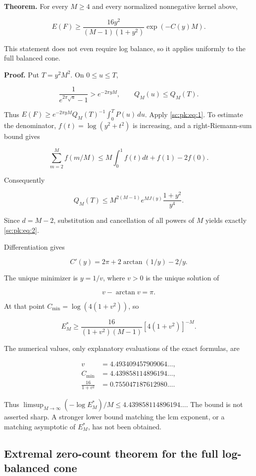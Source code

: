 \documentclass[11pt,a4paper]{article}
\theoremstyle{definition}
\theoremstyle{remark}
\theoremstyle{plain}
\numberwithin{equation}{section}
\begin{document}
\textbf{Theorem.} For every $M\ge4$ and every normalized nonnegative kernel
above,

\[
E(F)\ge
\frac{16y^2}{(M-1)(1+y^2)}\exp(-C(y)M).
\tag{PK.2}\label{sc:pk:eq:2}
\]

This statement does not even require log balance, so it applies
uniformly to the full balanced cone.

\textbf{Proof.} Put $T=y^2M^2$. On $0\le u\le T$,

\[
\frac1{e^{2\pi\sqrt u}-1}>e^{-2\pi yM},\qquad Q_M(u)\le Q_M(T).
\]

Thus $E(F)\ge e^{-2\pi yM}Q_M(T)^{-1}\int_0^TP(u)\,du$. Apply \eqref{sc:pk:eq:1}.
To estimate the denominator, $f(t)=\log(y^2+t^2)$ is increasing, and a
right-Riemann-sum bound gives

\[
\sum_{m=2}^M f(m/M)
\le M\int_0^1f(t)dt+f(1)-2f(0).
\]

Consequently

\[
Q_M(T)\le M^{2(M-1)}e^{MJ(y)}\frac{1+y^2}{y^4}.
\]

Since $d=M-2$, substitution and cancellation of all powers of $M$ yields
exactly \eqref{sc:pk:eq:2}.

Differentiation gives

\[
C'(y)=2\pi+2\arctan(1/y)-2/y.
\]

The unique minimizer is $y=1/v$, where $v>0$ is the unique
solution of

\[
v-\arctan v=\pi.
\]

At that point $C_{\min}=\log(4(1+v^2))$, so

\[
\boxed{
E_M^*\ge
\frac{16}{(1+v^2)(M-1)}[4(1+v^2)]^{-M}.
}
\tag{PK.3}\label{sc:pk:eq:3}
\]

The numerical values, only explanatory evaluations of the exact
formulas, are

\begin{align*}
v&=4.493409457909064\ldots,\\
C_{\min}&=4.439858114896194\ldots,\\
\frac{16}{1+v^2}&=0.755047187612980\ldots.
\end{align*}

Thus \(\limsup_{M\to\infty}(-\log E_M^*)/M\le4.439858114896194\ldots\).
The bound is not asserted sharp. A stronger lower bound matching the lcm
exponent, or a matching asymptotic of $E_M^*$, has not been obtained.

\subsection{Extremal zero-count theorem for the full log-balanced
cone}\label{sc:pk:extremal-zero-count-theorem-for-the-full-log-balanced-cone}
\end{document}
